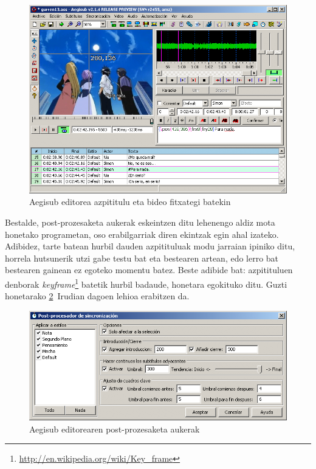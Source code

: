 \begin{figure}[htbp]
\begin{center}
\includegraphics[width=\columnwidth, natwidth=728pt, natheight=532pt]{Pictures/Chapter2/aegisub-bideo.png}
\caption{Aegisub editorea azpititulu eta bideo fitxategi batekin}
\label{aegisub-bideo}
\end{center}
\end{figure}

Bestalde, post-prozesaketa aukerak eskeintzen ditu lehenengo aldiz mota honetako programetan, oso erabilgarriak diren ekintzak egin ahal izateko. Adibidez, tarte batean hurbil dauden azpitituluak modu jarraian ipiniko ditu, horrela hutsunerik utzi gabe testu bat eta bestearen artean, edo lerro bat bestearen gainean ez egoteko momentu batez. Beste adibide bat: azpitituluen denborak \textit{keyframe}\footnote{\url{http://en.wikipedia.org/wiki/Key_frame}} batetik hurbil badaude, honetara egokituko ditu. Guzti honetarako \ref{aegisub-post}~Irudian dagoen lehioa erabitzen da.

\begin{figure}[htbp]
\begin{center}
\includegraphics[width=\columnwidth, natwidth=630pt, natheight=268pt]{Pictures/Chapter2/aegisub-post.png}
\caption{Aegisub editorearen post-prozesaketa aukerak}
\label{aegisub-post}
\end{center}
\end{figure}


